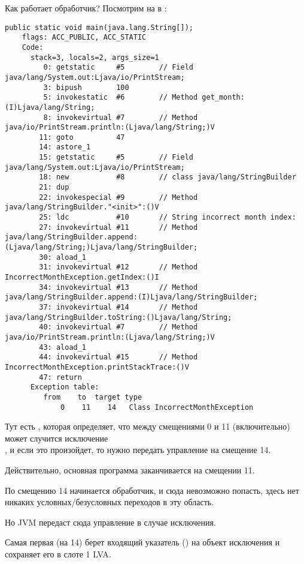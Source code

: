 Как работает обработчик?
Посмотрим на \main в :

\begin{lstlisting}[caption=Month2.class]
  public static void main(java.lang.String[]);
    flags: ACC_PUBLIC, ACC_STATIC
    Code:
      stack=3, locals=2, args_size=1
         0: getstatic     #5        // Field java/lang/System.out:Ljava/io/PrintStream;
         3: bipush        100
         5: invokestatic  #6        // Method get_month:(I)Ljava/lang/String;
         8: invokevirtual #7        // Method java/io/PrintStream.println:(Ljava/lang/String;)V
        11: goto          47
        14: astore_1      
        15: getstatic     #5        // Field java/lang/System.out:Ljava/io/PrintStream;
        18: new           #8        // class java/lang/StringBuilder
        21: dup           
        22: invokespecial #9        // Method java/lang/StringBuilder."<init>":()V
        25: ldc           #10       // String incorrect month index: 
        27: invokevirtual #11       // Method java/lang/StringBuilder.append:(Ljava/lang/String;)Ljava/lang/StringBuilder;
        30: aload_1       
        31: invokevirtual #12       // Method IncorrectMonthException.getIndex:()I
        34: invokevirtual #13       // Method java/lang/StringBuilder.append:(I)Ljava/lang/StringBuilder;
        37: invokevirtual #14       // Method java/lang/StringBuilder.toString:()Ljava/lang/String;
        40: invokevirtual #7        // Method java/io/PrintStream.println:(Ljava/lang/String;)V
        43: aload_1       
        44: invokevirtual #15       // Method IncorrectMonthException.printStackTrace:()V
        47: return        
      Exception table:
         from    to  target type
             0    11    14   Class IncorrectMonthException
\end{lstlisting}

Тут есть , которая определяет, что между смещениями 0 и 11 (включительно)
может случится исключение \\
, и если это произойдет, то нужно передать
управление на смещение 14.

Действительно, основная программа заканчивается на смещении 11.

По смещению 14 начинается обработчик, и сюда невозможно попасть, 
здесь нет никаких условных/безусловных переходов в эту область.

Но \ac{JVM} передаст сюда управление в случае исключения.

Самая первая  (на 14) берет входящий указатель () на объект 
исключения и сохраняет его в слоте 1 \ac{LVA}.

